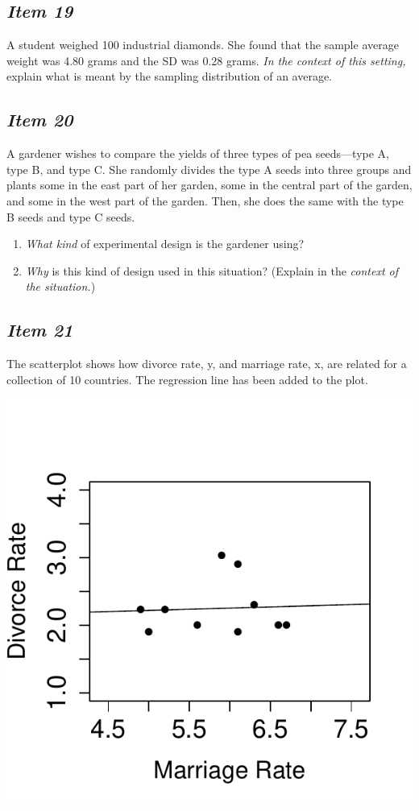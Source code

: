 \subsection{\textbf{\textit{Item 19}}}
A student weighed 100 industrial diamonds.  She found that the sample average weight was 4.80 grams and the SD was 0.28 grams. \textit{In the context of this setting,} explain what is meant by the sampling distribution of an average.

\subsection{\textbf{\textit{Item 20}}}
A gardener wishes to compare the yields of three types of pea seeds---type A, type B, and type C.  She randomly divides the type A seeds into three groups and plants some in the east part of her garden, some in the central part of the garden, and some in the west part of the garden.  Then, she does the same with the type B seeds and type C seeds.
\begin{enumerate}[leftmargin=1cm, itemsep=.2em]
\item \textit{What kind} of experimental design is the gardener using?
\item \textit{Why} is this kind of design used in this situation?  (Explain in the \textit{context of the situation.})
\end{enumerate}

\subsection{\textbf{\textit{Item 21}}}
The scatterplot shows how divorce rate, y, and marriage rate, x, are related for a collection of 10 countries.  The regression line has been added to the plot.

\begin{marginfigure}
\centering
\includegraphics{includes/Item13_R.pdf}
\end{marginfigure}

